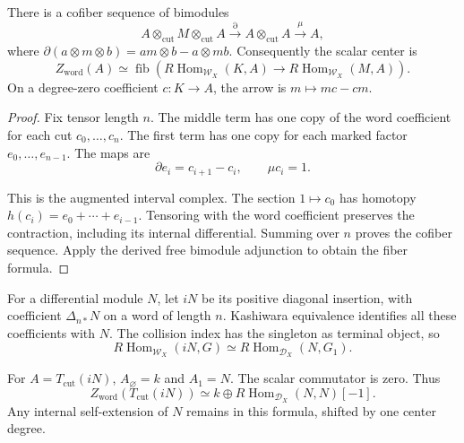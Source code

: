 \begin{proposition}\label{v4-arith:centers:prop:free-resolution}
There is a cofiber sequence of bimodules
\[
 A\otimes_{\mathrm{cut}}M\otimes_{\mathrm{cut}}A
 \xrightarrow{\partial}
 A\otimes_{\mathrm{cut}}A
 \xrightarrow{\mu}A,
\]
where
$\partial(a\otimes m\otimes b)=am\otimes b-a\otimes mb$.
Consequently the scalar center is
\[
 Z_{\mathrm{word}}(A)\simeq
 \operatorname{fib}\left(
 R\operatorname{Hom}_{\mathcal W_X}(K,A)
 \longrightarrow
 R\operatorname{Hom}_{\mathcal W_X}(M,A)\right).
\]
On a degree-zero coefficient $c:K\to A$,
the arrow is $m\mapsto mc-cm$.
\end{proposition}

\begin{proof}
Fix tensor length $n$. The middle term has
one copy of the word coefficient for each
cut $c_0,\ldots,c_n$. The first term has
one copy for each marked factor
$e_0,\ldots,e_{n-1}$. The maps are
\[
 \partial e_i=c_{i+1}-c_i,\qquad
 \mu c_i=1.
\]

This is the augmented interval complex.
The section $1\mapsto c_0$ has homotopy
$h(c_i)=e_0+\cdots+e_{i-1}$.
Tensoring with the word coefficient
preserves the contraction, including
its internal differential. Summing
over $n$ proves the cofiber sequence.
Apply the derived free bimodule
adjunction to obtain the fiber formula.
\end{proof}

For a differential module $N$, let $iN$
be its positive diagonal insertion,
with coefficient $\Delta_{n*}N$ on a
word of length $n$. Kashiwara
equivalence identifies all these
coefficients with $N$. The collision
index has the singleton as terminal
object, so
\[
 R\operatorname{Hom}_{\mathcal W_X}(iN,G)
 \simeq R\operatorname{Hom}_{\mathcal D_X}(N,G_1).
\]

For $A=T_{\mathrm{cut}}(iN)$,
$A_\varnothing=k$ and $A_1=N$.
The scalar commutator is zero.
Thus
\begin{equation}\label{v4-arith:centers:eq:diagonal-free}
 Z_{\mathrm{word}}(T_{\mathrm{cut}}(iN))
 \simeq
 k\oplus R\operatorname{Hom}_{\mathcal D_X}(N,N)[-1].
\end{equation}
Any internal self-extension of $N$
remains in this formula, shifted by
one center degree.


